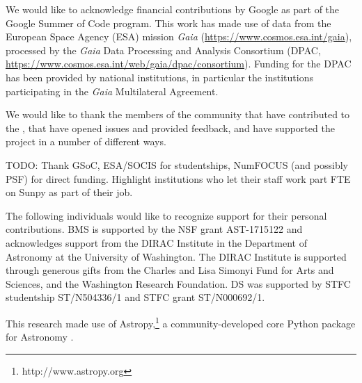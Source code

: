 \acknowledgments

We would like to acknowledge financial contributions by Google as part of the Google Summer of Code program.
This work has made use of data from the European Space Agency (ESA) mission {\it Gaia} (\url{https://www.cosmos.esa.int/gaia}), processed by the {\it Gaia} Data Processing and Analysis Consortium (DPAC, \url{https://www.cosmos.esa.int/web/gaia/dpac/consortium}).
Funding for the DPAC has been provided by national institutions, in particular the institutions participating in the {\it Gaia} Multilateral Agreement.

We would like to thank the members of the community that have contributed to the \sunpyproj, that have opened issues and provided feedback, and have supported the project in a number of different ways.

TODO: Thank GSoC, ESA/SOCIS for studentships, NumFOCUS (and possibly PSF) for direct funding.
Highlight institutions who let their staff work part FTE on Sunpy as part of their job.

The following individuals would like to recognize support for their personal contributions.
BMS is supported by the NSF grant AST-1715122 and acknowledges support from the DIRAC Institute in the Department of Astronomy at the University of Washington.
The DIRAC Institute is supported through generous gifts from the Charles and Lisa Simonyi Fund for Arts and Sciences, and the Washington Research Foundation.
DS was supported by STFC studentship ST/N504336/1 and STFC grant ST/N000692/1.

This research made use of Astropy,\footnote{http://www.astropy.org} a community-developed core Python package for Astronomy \citep{astropy2013, astropy2018}.




